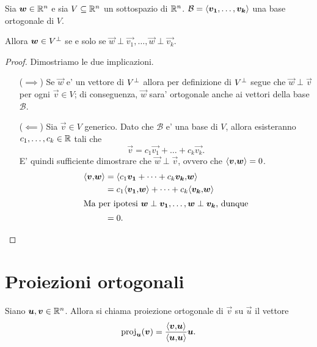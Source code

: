 \begin{proposition} \label{w_in_ortog_sse_ortogonale_base}
    Sia $\vec w \in \R^n$ e sia $V \subseteq \R^n$ un sottospazio di $\R^n$. $\mathcal{B} = \basis{\vec{v_1}, \dots, \vec{v_k}}$ una base ortogonale di $V$.
    
    Allora $\vec w \in \ortog{V}$ se e solo se $\vec w \perp \vec{v_1}, \dots, \vec w \perp \vec{v_k}$.
\end{proposition}
\begin{proof}
    Dimostriamo le due implicazioni.
    \begin{itemize}
        \item[($\implies$)] Se $\vec w$ e' un vettore di $\ortog{V}$ allora per definizione di $\ortog{V}$ segue che $\vec w \perp \vec v$ per ogni $\vec v \in V$; di conseguenza, $\vec w$ sara' ortogonale anche ai vettori della base $\mathcal{B}$.
        \item[($\impliedby$)] Sia $\vec v \in V$ generico. 
        Dato che $\mathcal{B}$ e' una base di $V$, allora esisteranno $c_1, \dots, c_k \in \R$ tali che \[
            \vec v = c_1\vec{v_1} + \dots + c_k\vec{v_k}.    
        \]
        E' quindi sufficiente dimostrare che $\vec w \perp \vec v$, ovvero che $\innerprod{\vec v}{\vec w} = 0$.
        \begin{align*}
            \innerprod{\vec v}{\vec w} &= \innerprod{c_1\vec{v_1} + \dots + c_k\vec{v_k}}{\vec w} \\
            &= c_1\innerprod{\vec{v_1}}{\vec w} + \dots + c_k\innerprod{\vec{v_k}}{\vec w} \\
            \intertext{Ma per ipotesi $\vec w \perp \vec{v_1}, \dots, \vec w \perp \vec{v_k}$, dunque}
            &= 0. \qedhere
        \end{align*} 
    \end{itemize}
\end{proof}

\section{Proiezioni ortogonali}

\begin{definition}
    Siano $\vec u, \vec v \in \R^n$. Allora si chiama proiezione ortogonale di $\vec v$ su $\vec u$ il vettore \[
        \proj{\vec v}{\vec u} = \frac{\innerprod{\vec v}{\vec u}}{\innerprod{\vec u}{\vec u}}\vec u.
    \]
\end{definition}


